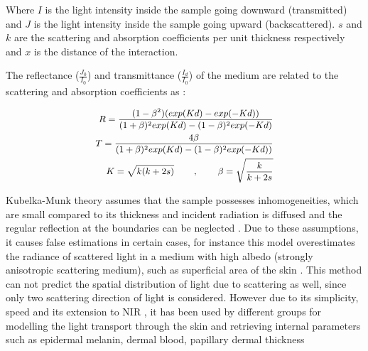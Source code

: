 Where $I$ is the light intensity inside the sample going downward (transmitted) and $J$ is the light intensity inside the sample going upward (backscattered). $s$ and $k$ are the scattering and absorption coefficients per unit thickness respectively and $x$ is the distance of the interaction. 

The reflectance ($\frac{J_{0}}{I_{0}}$) and transmittance ($\frac{I_{d}}{I_{0}}$) of the medium are related to the scattering and absorption coefficients as :

	
	\begin{subequations}
	\small
	\begin{align}
	R = \frac{(1-\beta ^{2})(exp(Kd)-exp(-Kd))}{(1+\beta) ^{2}exp(Kd)-(1-\beta) ^{2}exp(-Kd)}\\
	T = \frac{4\beta} {(1+\beta)^{2}exp(Kd)-(1-\beta)^{2} exp(-Kd))}\\  
	K = \sqrt{k(k+2s)} \hspace{0.7cm},\hspace{0.7cm}  \beta = \sqrt{\frac{k}{k+2s}}
	\end{align}
	\label{eq:RTKB}
	\end{subequations}


Kubelka-Munk theory assumes that the sample possesses inhomogeneities, which are small compared to its thickness and incident radiation is diffused and the regular reflection at the boundaries can be neglected \cite{jolivot2011developpement}. Due to these assumptions, it causes false estimations in certain cases, for instance this model overestimates the radiance of scattered light in a medium with high albedo (strongly anisotropic scattering medium), such as superficial area of the skin \cite{igarashi2007appearance}. This method can not predict the spatial distribution of light due to scattering as well, since only two scattering direction of light is considered. 
However due to its simplicity, speed and its extension to NIR \cite{cotton1997noninvasive}, it has been used by different groups for modelling the light transport through the skin and retrieving internal parameters such as epidermal melanin, dermal blood, papillary dermal thickness \cite{cotton1997noninvasive,jolivot2011developpement}



